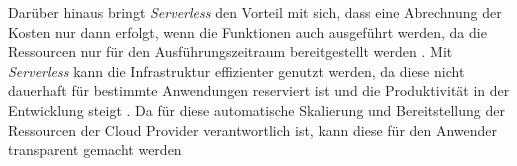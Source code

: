 Darüber hinaus bringt \textit{Serverless} den Vorteil mit sich, dass eine Abrechnung der Kosten nur dann erfolgt, wenn die Funktionen auch ausgeführt werden, da die Ressourcen nur für den Ausführungszeitraum bereitgestellt werden \cite[Vgl.][S. 46]{Castro2019}. Mit \textit{Serverless} kann die Infrastruktur effizienter genutzt werden, da diese nicht dauerhaft für bestimmte Anwendungen reserviert ist und die Produktivität in der Entwicklung steigt \cite[Vgl.][S. 9]{Jonas2019}. Da für diese automatische Skalierung und Bereitstellung der Ressourcen der Cloud Provider verantwortlich ist, kann diese für den Anwender transparent gemacht werden \cite[Vgl.][S. 47]{Castro2019}
\pagebreak